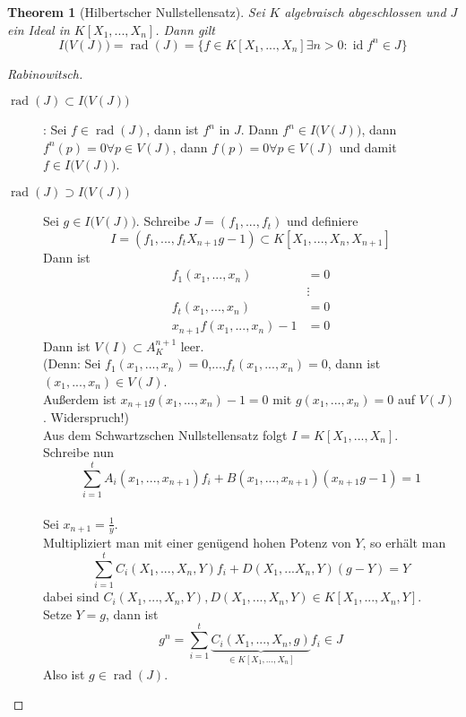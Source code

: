 \documentclass[10pt,a4paper]{article}
\newcommand{\id}{\operatorname{id}}
\newcommand{\rad}{\operatorname{rad}}
\theoremstyle{plain}
\newtheorem{theorem}{Theorem}[section]
\theoremstyle{definition}
\theoremstyle{remark}
\begin{document}
	\begin{theorem}[Hilbertscher Nullstellensatz]
		Sei $K$ algebraisch abgeschlossen und $J$ ein Ideal in $K[X_1,...,X_n]$. Dann gilt
		\[I\big(V(J)\big)=\rad(J)=\{f\in K[X_1,...,X_n]\exists n>0:\id f^n\in J\}\]
	\end{theorem}
	\begin{proof}[Rabinowitsch]
		\begin{description}
			\item[$\rad(J)\subset I\big(V(J)\big)$]: Sei $f\in \rad(J)$, dann ist $f^n$ in $J$. Dann $f^n\in I\big(V(J)\big)$, dann $f^n(p)=0\forall p\in V(J)$, dann $f(p)=0\forall p\in V(J)$ und damit $f\in I\big(V(J)\big)$.
			\item[$\rad(J)\supset I\big(V(J)\big)$] Sei $g\in I\big(V(J)\big)$. Schreibe $J=(f_1,...,f_t)$ und definiere
			\[I=(f_1,...,f_tX_{n+1}g-1)\subset K[X_1,...,X_n,X_{n+1}]\]
			Dann ist
			\begin{align*}
			f_1(x_1,...,x_n)&=0\\
			&\vdots\\
			f_t(x_1,...,x_n)&=0\\
			x_{n+1}f(x_1,...,x_n)-1&=0
			\end{align*}
			Dann ist $V(I)\subset A_K^{n+1}$ leer.\\
			(Denn: Sei $f_1(x_1,...,x_n)=0$,...,$f_t(x_1,...,x_n)=0$, dann ist $(x_1,...,x_n)\in V(J)$.\\
			Außerdem ist $x_{n+1}g(x_1,...,x_n)-1=0$ mit $g(x_1,...,x_n)=0$ auf $V(J)$. Widerspruch!)\\
			Aus dem Schwartzschen Nullstellensatz folgt $I=K[X_1,...,X_n]$.\\
			Schreibe nun 
			\[\sum_{i=1}^{t}A_i(x_1,...,x_{n+1})f_i+B(x_1,...,x_{n+1})(x_{n+1}g-1)=1\]\\
			Sei $x_{n+1}=\frac{1}{y}$.\\
			Multipliziert man mit einer genügend hohen Potenz von $Y$, so erhält man
			\[\sum_{i=1}^tC_i(X_1,...,X_n,Y)f_i+D(X_1,...X_n,Y)(g-Y)=Y\]
			dabei sind $C_i(X_1,...,X_n,Y),D(X_1,...,X_n,Y)\in K[X_1,...,X_n,Y]$.\\
			Setze $Y=g$, dann ist
			\[g^n=\sum_{i=1}^{t}\underbrace{C_i(X_1,...,X_n,g)}_{\in K[X_1,...,X_n]}f_i\in J\]
			Also ist $g\in\rad(J)$.
		\end{description}
	\end{proof}
\end{document}
